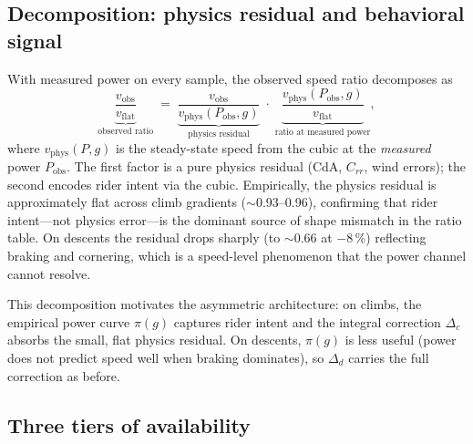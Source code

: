 \documentclass[11pt,a4paper]{article}
\begin{document}
\subsection{Decomposition: physics residual and behavioral signal}

With measured power on every sample, the observed speed ratio
decomposes as
\begin{equation}
\label{eq:decomposition}
\underbrace{\frac{v_\text{obs}}{v_\text{flat}}}_{\text{observed ratio}}
\;=\;
\underbrace{\frac{v_\text{obs}}{v_\text{phys}(P_\text{obs}, g)}}_{\text{physics residual}}
\;\cdot\;
\underbrace{\frac{v_\text{phys}(P_\text{obs}, g)}{v_\text{flat}}}_{\text{ratio at measured power}},
\end{equation}
where $v_\text{phys}(P, g)$ is the steady-state speed from the cubic
at the \emph{measured} power $P_\text{obs}$. The first factor is a
pure physics residual (CdA, $C_{rr}$, wind errors); the second
encodes rider intent via the cubic. Empirically, the physics residual
is approximately flat across climb gradients ($\sim$0.93--0.96),
confirming that rider intent---not physics error---is the dominant
source of shape mismatch in the ratio table. On descents the residual
drops sharply (to $\sim$0.66 at $-8$\,\%) reflecting braking and
cornering, which is a speed-level phenomenon that the power channel
cannot resolve.

This decomposition motivates the asymmetric architecture: on climbs,
the empirical power curve $\pi(g)$ captures rider intent and the
integral correction $\Delta_c$ absorbs the small, flat physics
residual. On descents, $\pi(g)$ is less useful (power does not
predict speed well when braking dominates), so $\Delta_d$ carries
the full correction as before.

\subsection{Three tiers of availability}
\label{sec:power-tiers}
\end{document}
